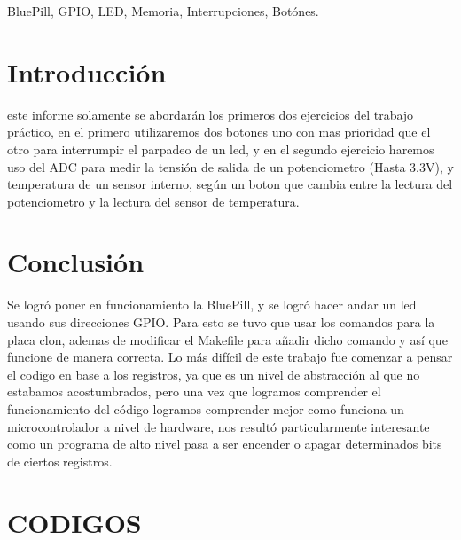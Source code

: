 \documentclass{plantilla}
\begin{document}
\maketitle

\begin{abstract}
En este informe se abordará el desarrollo del trabajo práctico Nro 2, en el cual experimentaremos con las interrupciones externas del microcontrolador STM32F103C8T6, utilizando la placa BluePill. Se desarrollaran los primeros dos ejercicios del trabajo práctico.
\end{abstract}

\begin{IEEEkeywords}
BluePill, GPIO, LED, Memoria, Interrupciones, Botónes.
\end{IEEEkeywords}

\section{Introducción}
 este informe solamente se abordarán los primeros dos ejercicios del trabajo práctico, en el primero utilizaremos dos botones uno con mas prioridad que el otro para interrumpir el parpadeo de un led, y en el segundo ejercicio haremos uso del ADC para medir la tensión de salida de un potenciometro (Hasta 3.3V), y temperatura de un sensor interno, según un boton que cambia entre la lectura del potenciometro y la lectura del sensor de temperatura.





\section{Conclusión}
Se logró poner en funcionamiento la BluePill, y se logró hacer andar un led usando sus direcciones GPIO. Para esto se tuvo que usar los comandos para la placa clon, ademas de modificar el Makefile para añadir dicho comando y así que funcione de manera correcta. Lo más difícil de este trabajo fue comenzar a pensar el codigo en base a los registros, ya que es un nivel de abstracción al que no estabamos acostumbrados, pero una vez que logramos comprender el funcionamiento del código logramos comprender mejor como funciona un microcontrolador a nivel de hardware, nos resultó particularmente interesante como un programa de alto nivel pasa a ser encender o apagar determinados bits de ciertos registros. 
\newpage
\section{CODIGOS}


\end{document}
